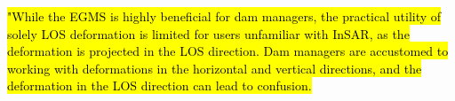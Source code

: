 \documentclass[11pt,a4paper]{article}
\begin{document}
\hl{\mbox{\parencite{ruiz-armenteros2023}} "While the EGMS is highly beneficial for dam managers, the practical utility of solely LOS deformation is limited for users unfamiliar with InSAR, as the deformation is projected in the LOS direction. Dam managers are accustomed to working with deformations in the horizontal and vertical directions, and the deformation in the LOS direction can lead to confusion.}







\end{document}
